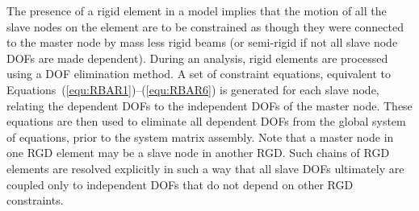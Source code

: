 The presence of a rigid element in a model implies that the motion of all the
slave nodes on the element are to be constrained as though they were connected
to the master node by mass less rigid beams (or semi-rigid if not all slave
node DOFs are made dependent).
During an analysis, rigid elements are processed using a DOF elimination method.
A set of constraint equations, equivalent to Equations~(\ref{equ:RBAR1})--(\ref{equ:RBAR6})
is generated for each slave node, relating the dependent DOFs to the
independent DOFs of the master node.
These equations are then used to eliminate all dependent DOFs from the
global system of equations, prior to the system matrix assembly.
Note that a master node in one RGD element may be a slave node in another RGD.
Such chains of RGD elements are resolved explicitly in such a way that all
slave DOFs ultimately are coupled only to independent DOFs that do not depend
on other RGD constraints.
